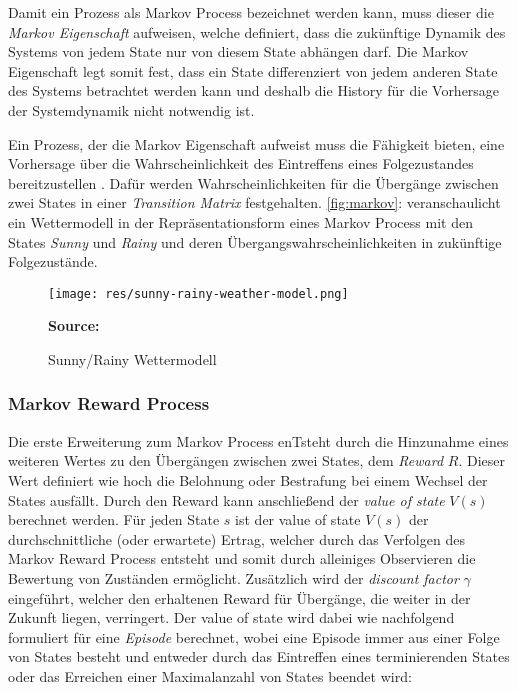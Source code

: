 \documentclass[11pt]{scrartcl}
\newcommand{\source}[1]{\vspace{-5pt} \caption*{\hfill \textbf{Source:} {#1}} }
\begin{document}
Damit ein Prozess als Markov Process bezeichnet werden kann, muss dieser die \textit{Markov Eigenschaft}
aufweisen, welche definiert, dass die zukünftige Dynamik des Systems von jedem State nur
von diesem State abhängen darf. Die Markov Eigenschaft legt somit fest, dass ein State
differenziert von jedem anderen State des Systems betrachtet werden kann und deshalb die
History für die Vorhersage der Systemdynamik nicht notwendig ist.

Ein Prozess, der die Markov Eigenschaft aufweist muss die Fähigkeit bieten, eine Vorhersage über
die Wahrscheinlichkeit des Eintreffens eines Folgezustandes bereitzustellen \cite[~S.12 f.]{L2018}. 
Dafür werden Wahrscheinlichkeiten für die Übergänge zwischen zwei States in einer
\textit{Transition Matrix} festgehalten. \autoref{fig:markov}: 
veranschaulicht ein Wettermodell in der Repräsentationsform eines Markov Process mit den States
\textit{Sunny} und \textit{Rainy} und deren Übergangswahrscheinlichkeiten in zukünftige
Folgezustände.

\begin{figure}[htp]
\centering
\texttt{[image: res/sunny-rainy-weather-model.png]}
\caption{Sunny/Rainy Wettermodell}
\source{\cite[~S.13 - Chapter 1 - Figure 4]{L2018}}
\label{fig:markov}
\end{figure}


\subsubsection{Markov Reward Process}
\label{sec:markov_reward_process}
Die erste Erweiterung zum Markov Process enTsteht durch die Hinzunahme eines weiteren Wertes zu den 
Übergängen zwischen zwei States, dem \textit{Reward} $R$. Dieser Wert definiert wie hoch die Belohnung
oder Bestrafung bei einem Wechsel der States ausfällt. Durch den Reward kann anschließend der
\textit{value of state} $V(s)$ berechnet werden. Für jeden State $s$ ist der value of state $V(s)$
der durchschnittliche (oder erwartete) Ertrag, welcher durch das Verfolgen des Markov Reward Process
entsteht und somit durch alleiniges Observieren die Bewertung von Zuständen ermöglicht.
Zusätzlich wird der \textit{discount factor} $\gamma$ eingeführt, welcher den erhaltenen Reward
für Übergänge, die weiter in der Zukunft liegen, verringert. Der value of state wird dabei wie
nachfolgend formuliert für eine \textit{Episode} berechnet, wobei eine Episode immer aus einer
Folge von States besteht und entweder durch das Eintreffen eines terminierenden States oder das
Erreichen einer Maximalanzahl von States beendet wird:
\end{document}
